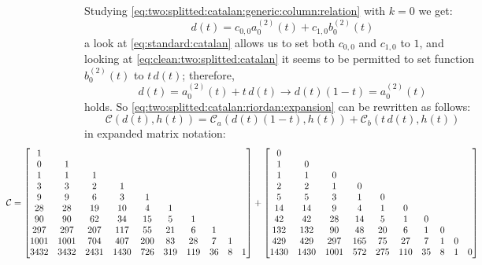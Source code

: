 Studying \autoref{eq:two:splitted:catalan:generic:column:relation}
with $k=0$ we get:
\begin{equation} 
    d(t) = c_{0,0}a_{0}^{(2)}(t) + c_{1,0}b_{0}^{(2)}(t)
\end{equation} 
a look at \autoref{eq:standard:catalan} allows us to set both $c_{0,0}$ and $c_{1,0}$ to $1$,
and looking at \autoref{eq:clean:two:splitted:catalan} it seems to be permitted to set 
function $b_{0}^{(2)}(t)$ to $t\,d(t)$; therefore, 
\begin{equation} 
    d(t) = a_{0}^{(2)}(t) + t\,d(t) \rightarrow d(t)(1-t) = a_{0}^{(2)}(t)
\end{equation} 
holds. So \autoref{eq:two:splitted:catalan:riordan:expansion} can be rewritten as follows:
\begin{displaymath} 
    \mathcal{C}(d(t), h(t)) = \mathcal{C}_{a}(d(t)(1-t), h(t)) + \mathcal{C}_{b}(t\,d(t), h(t))
\end{displaymath} 
in expanded matrix notation:
\begin{equation}
\hspace{-3cm}
\mathcal{C} = 
\left[\begin{matrix}
1 &  &  &  &  &  &  &  &  &  \\
0 & 1 &  &  &  &  &  &  &  &  \\
1 & 1 & 1 &  &  &  &  &  &  &  \\
3 & 3 & 2 & 1 &  &  &  &  &  &  \\
9 & 9 & 6 & 3 & 1 &  &  &  &  &  \\
28 & 28 & 19 & 10 & 4 & 1 &  &  &  &  \\
90 & 90 & 62 & 34 & 15 & 5 & 1 &  &  &  \\
297 & 297 & 207 & 117 & 55 & 21 & 6 & 1 &  &  \\
1001 & 1001 & 704 & 407 & 200 & 83 & 28 & 7 & 1 &  \\
3432 & 3432 & 2431 & 1430 & 726 & 319 & 119 & 36 & 8 & 1 \\
\end{matrix}\right] +
\left[\begin{matrix}
0 &  &  &  &  &  &  &  &  &  \\
1 & 0 &  &  &  &  &  &  &  &  \\
1 & 1 & 0 &  &  &  &  &  &  &  \\
2 & 2 & 1 & 0 &  &  &  &  &  &  \\
5 & 5 & 3 & 1 & 0 &  &  &  &  &  \\
14 & 14 & 9 & 4 & 1 & 0 &  &  &  &  \\
42 & 42 & 28 & 14 & 5 & 1 & 0 &  &  &  \\
132 & 132 & 90 & 48 & 20 & 6 & 1 & 0 &  &  \\
429 & 429 & 297 & 165 & 75 & 27 & 7 & 1 & 0 &  \\
1430 & 1430 & 1001 & 572 & 275 & 110 & 35 & 8 & 1 & 0 \\
\end{matrix}\right]\\ 
\label{eq:matrix:expansion:two:splitted:catalan}
\end{equation}


